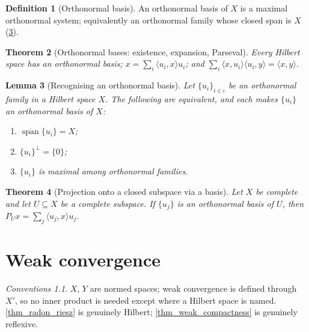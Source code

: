 \documentclass[a4paper]{report}
\theoremstyle{plain}
\newtheorem{theorem}{Theorem}[chapter]
\newtheorem{lemma}[theorem]{Lemma}
\theoremstyle{definition}
\newtheorem{definition}[theorem]{Definition}
\theoremstyle{remark}
\newtheorem{assumptions}[theorem]{Conventions}
\begin{document}
\begin{definition}[Orthonormal basis]
  \label{def_hilbert_basis}
  An orthonormal basis of $X$ is a maximal orthonormal system; equivalently an orthonormal
  family whose closed span is $X$ (\cref{lem_onb_criterion}).
\end{definition}


\begin{theorem}[Orthonormal bases: existence, expansion, Parseval]
  \label{thm_onb}
  Every Hilbert space has an orthonormal basis; $x = \sum_i \langle u_i,x\rangle u_i$; and
  $\sum_i \langle x,u_i\rangle\langle u_i,y\rangle = \langle x,y\rangle$.
\end{theorem}


\begin{lemma}[Recognising an orthonormal basis]
  \label{lem_onb_criterion}
  Let $\{u_i\}_{i \in \iota}$ be an orthonormal family in a Hilbert space $X$.  The
  following are equivalent, and each makes $\{u_i\}$ an orthonormal basis of $X$:
  \begin{enumerate}
    \item $\overline{\operatorname{span}}\{u_i\} = X$;
    \item $\{u_i\}^\perp = \{0\}$;
    \item $\{u_i\}$ is maximal among orthonormal families.
  \end{enumerate}
\end{lemma}



\begin{theorem}[Projection onto a closed subspace via a basis]
  \label{thm_proj_expansion}
  Let $X$ be complete and let $U \subseteq X$ be a complete subspace.  If $\{u_j\}$ is an orthonormal basis
  of $U$, then $P_Ux = \sum_j \langle u_j,x\rangle u_j$.
\end{theorem}


\chapter{Weak convergence}
\label{ch_05_weak_convergence}

\begin{assumptions}
  \label{asm_weak_convergence}
  $X$, $Y$ are normed spaces; weak convergence is
defined through $X'$, so no inner product is needed except where a Hilbert space is named.
\cref{thm_radon_riesz} is genuinely Hilbert; \cref{thm_weak_compactness} is genuinely
reflexive.
\end{assumptions}
\end{document}
